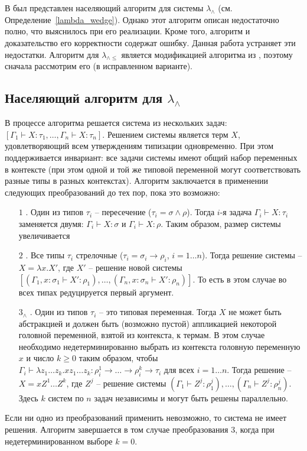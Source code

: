 \documentclass[../main.tex]{subfiles}
\begin{document}
 \label{sec:the_algorithm}

В \cite{kusmierek_2007} был представлен населяющий алгоритм для системы $\lambda_\wedge$ (см. Определение~\ref{lambda_wedge}). Однако этот  алгоритм описан недостаточно полно, что выяснилось при его реализации. Кроме того, алгоритм и доказательство его корректности содержат ошибку. Данная работа устраняет эти недостатки. Алгоритм для $\lambda_{\wedge \leqslant}$ является модификацией алгоритма из \cite{kusmierek_2007}, поэтому сначала рассмотрим его (в исправленном варианте).


\subsection{Населяющий алгоритм для $\lambda_\wedge$}

\begin{algorithm} \label{алгоритм без эты}

В процессе алгоритма решается система из нескольких задач: $[\Gamma_1 \vdash X : \tau_1 ,\dots, \Gamma_n \vdash X : \tau_n]$. Решением системы является терм $X$, удовлетворяющий всем утверждениям типизации одновременно. При этом поддерживается инвариант: все задачи системы имеют общий набор переменных в контексте (при этом одной и той же типовой переменной могут соответствовать разные типы в разных контекстах). Алгоритм заключается в применении следующих преобразований до тех пор, пока это возможно:
\begin{itemize}
    \item [$1$]. Один из типов $\tau_i$ -- пересечение ($\tau_i = \sigma \wedge \rho$). Тогда $i$-я задача $\Gamma_i \vdash X : \tau_i$ заменяется двумя:  $\Gamma_i \vdash X : \sigma$ и $\Gamma_i \vdash X : \rho$. Таким образом, размер системы увеличивается
     \item [$2$]. Все типы $\tau_i$ стрелочные  ($\tau_i = \sigma_i \to \rho_i$, $i = 1 \dots n$). Тогда решение системы --  $X = \lambda x.X'$, где $X'$ -- решение новой системы  $[(\Gamma_1, x:\sigma_1 \vdash X' : \rho_1) ,\dots, (\Gamma_n, x:\sigma_n \vdash X' : \rho_n)]$. То есть в этом случае во всех типах редуцируется первый аргумент. 
     \item [$3_{\wedge}$]. Один из типов $\tau_i$ -- это типовая переменная. Тогда $X$ не может быть абстракцией и должен быть (возможно пустой) аппликацией некоторой головной переменной, взятой из контекста, к термам. В этом случае необходимо недетерминированно выбрать из контекста головную переменную $x$ и число $k \geqslant 0$ таким образом, чтобы  $\Gamma_i \vdash \lambda z_1 \dots z_k . x z_1 \dots z_k : \rho_i^1 \to \dots \to \rho_i^k \to \tau_i$ для всех $i = 1 \dots n$. Тогда решение --  $X = x Z^1 \dots Z^k$, где $Z^j$ -- решение системы $(\Gamma_1 \vdash Z^j : \rho_1^j) ,\dots, (\Gamma_n \vdash Z^j : \rho_n^j)$. Здесь $k$ систем по $n$ задач независимы и могут быть решены параллельно.
\end{itemize}

Если ни одно из преобразований применить невозможно, то система не имеет решения. 
Алгоритм завершается в том случае преобразования $3$, когда при недетерминированном выборе $k = 0$.
    
\end{algorithm}
\end{document}
